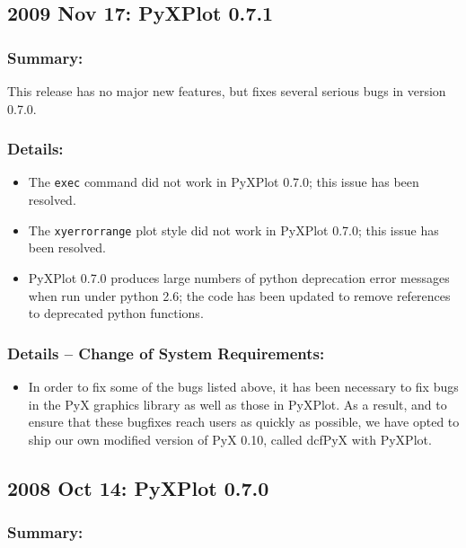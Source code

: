 \subsection*{2009 Nov 17: PyXPlot 0.7.1}

\subsubsection*{Summary:}

This release has no major new features, but fixes several serious bugs in version 0.7.0.

\subsubsection*{Details:}

\begin{itemize}
\item The {\tt exec} command did not work in PyXPlot 0.7.0; this issue has been resolved.
\item The {\tt xyerrorrange} plot style did not work in PyXPlot 0.7.0; this issue has been resolved.
\item PyXPlot 0.7.0 produces large numbers of python deprecation error messages when run under python 2.6; the code has been updated to remove references to deprecated python functions.
\end{itemize}

\subsubsection*{Details -- Change of System Requirements:}

\begin{itemize}
\item In order to fix some of the bugs listed above, it has been necessary to
fix bugs in the PyX graphics library as well as those in PyXPlot. As a result,
and to ensure that these bugfixes reach users as quickly as possible, we have
opted to ship our own modified version of PyX 0.10, called dcfPyX with PyXPlot.
\end{itemize}

\subsection*{2008 Oct 14: PyXPlot 0.7.0}

\subsubsection*{Summary:}

